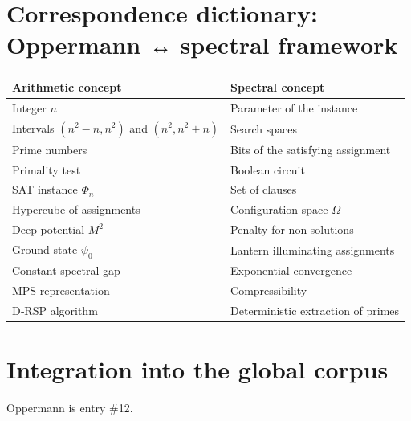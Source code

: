 \documentclass[11pt,a4paper]{article}
\begin{document}
\section{Correspondence dictionary: Oppermann ↔ spectral framework}

\begin{center}
\small
\begin{tabular}{@{}l|l@{}}
\toprule
\textbf{Arithmetic concept} & \textbf{Spectral concept} \\
\midrule
Integer $n$ & Parameter of the instance \\
Intervals $(n^2-n, n^2)$ and $(n^2, n^2+n)$ & Search spaces \\
Prime numbers & Bits of the satisfying assignment \\
Primality test & Boolean circuit \\
SAT instance $\Phi_n$ & Set of clauses \\
Hypercube of assignments & Configuration space $\Omega$ \\
Deep potential $M^2$ & Penalty for non‑solutions \\
Ground state $\psi_0$ & Lantern illuminating assignments \\
Constant spectral gap & Exponential convergence \\
MPS representation & Compressibility \\
D‑RSP algorithm & Deterministic extraction of primes \\
\bottomrule
\end{tabular}
\end{center}

\section{Integration into the global corpus}

Oppermann is entry \#12.
\end{document}

